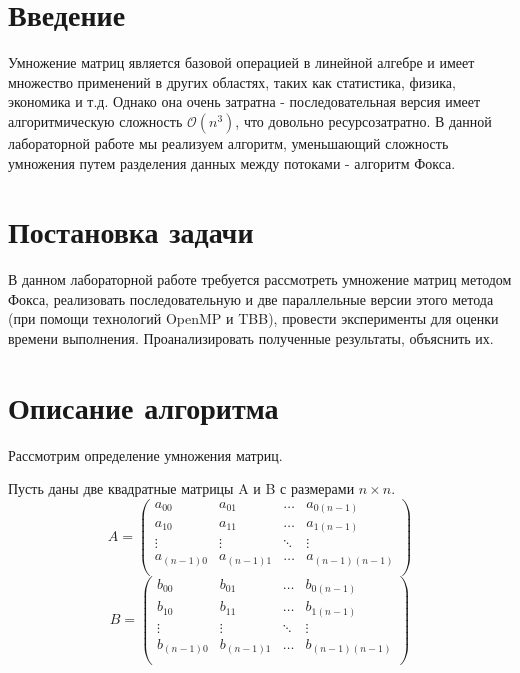 \documentclass{article}
\begin{document}
\setcounter{page}{2}

\tableofcontents
\newpage

\section*{Введение}
\setcounter{section}{1}
\par 
Умножение матриц является базовой операцией в линейной алгебре и имеет множество применений в других областях, таких как
статистика, физика, экономика и т.д. Однако она очень затратна - последовательная версия имеет алгоритмическую сложность 
$\mathcal{O}(n^3)$, что довольно ресурсозатратно. В данной лабораторной работе мы реализуем алгоритм, уменьшающий сложность умножения
путем разделения данных между потоками - алгоритм Фокса. 
\newpage

\section*{Постановка задачи}
\par 
В данном лабораторной работе требуется рассмотреть умножение матриц методом Фокса, реализовать последовательную
и две параллельные версии этого метода (при помощи технологий OpenMP и TBB), провести эксперименты для оценки времени выполнения. 
Проанализировать полученные результаты, объяснить их.
\newpage

\section*{Описание алгоритма}
\par
Рассмотрим определение умножения матриц.
\par
Пусть даны две квадратные матрицы A и B с размерами \(n \times n\).
\[ 
	A = \left( 
		\begin{matrix}
			a_{00} & a_{0 1} & \ldots & a_{0(n-1)}\\
			a_{10} & a_{1 1} & \ldots & a_{1(n-1)}\\
			\vdots & \vdots & \ddots & \vdots\\
			a_{(n-1)0} & a_{(n-1)1} & \ldots & a_{(n-1)(n-1)}\\
		\end{matrix}
	\right)
\]
\[
	B = \left( 
		\begin{matrix}
			b_{00} & b_{0 1} & \ldots & b_{0(n-1)}\\
			b_{10} & b_{1 1} & \ldots & b_{1(n-1)}\\
			\vdots & \vdots & \ddots & \vdots\\
			b_{(n-1)0} & b_{(n-1)1} & \ldots & b_{(n-1)(n-1)}\\
		\end{matrix}
	\right)
\]
\end{document}
